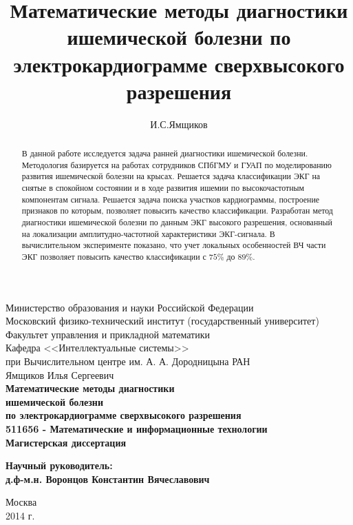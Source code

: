 \documentclass[a4paper,12pt]{extarticle}
\title{Математические методы диагностики ишемической болезни по электрокардиограмме сверхвысокого разрешения}
\author{И.С.Ямщиков}
\begin{document}
{
\renewcommand{\baselinestretch}{1}
\thispagestyle{empty}
\begin{center}
    \sc
        Министерство образования и науки Российской Федерации\\
        Московский физико-технический институт
        {\rm(государственный университет)}\\
        Факультет управления и прикладной математики\\
        Кафедра <<Интеллектуальные системы>>\\
        при Вычислительном центре им. А. А. Дородницына РАН\\[35mm]

    \rm\large
        Ямщиков Илья Сергеевич\\[10mm]
    \bf\Large
        Математические методы диагностики\\
        ишемической болезни \\
        по электрокардиограмме сверхвысокого разрешения\\[10mm]
    \rm\normalsize
        511656 - Математические и информационные технологии\\[10mm]
    \sc
        Магистерская диссертация\\[30mm]
\end{center}
\hfill\parbox{80mm}{
    \begin{flushleft}
    \bf
        Научный руководитель:\\
    \rm
        д.ф-м.н. Воронцов Константин Вячеславович\\[5cm]
    \end{flushleft}
}
\begin{center}
    Москва\\
    2014 г.
\end{center}
}

\tableofcontents

\newpage
\begin{abstract}
В данной работе исследуется задача ранней диагностики ишемической болезни. Методология базируется на работах сотрудников СПбГМУ и ГУАП по моделированию развития ишемической болезни на крысах. Решается задача классификации ЭКГ на снятые в спокойном состоянии и в ходе развития ишемии по высокочастотным компонентам сигнала. Решается задача поиска участков кардиограммы, построение признаков по которым, позволяет повысить качество классификации. Разработан метод диагностики ишемической болезни по данным ЭКГ высокого разрешения, основанный на локализации амплитудно-частотной характеристики ЭКГ-сигнала. В вычислительном эксперименте показано, что учет локальных особенностей ВЧ части ЭКГ позволяет повысить качество классификации с $75\%$ до $89\%$.
\end{abstract}
\end{document}
